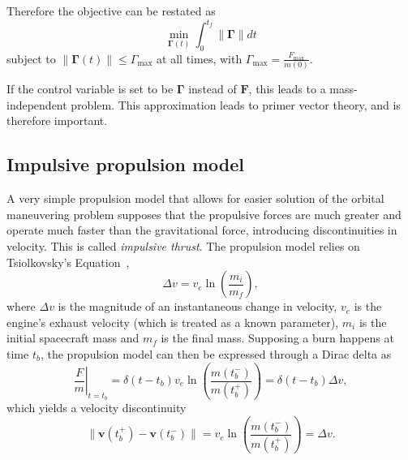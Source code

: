 Therefore the objective can be restated as
\begin{equation}\label{eq:obj_continuous_thrust}
    \min_{\mathbf{\Gamma}(t)} \int_0^{t_f} \lVert \mathbf{\Gamma} \rVert dt
\end{equation}
subject to \(\lVert \mathbf{\Gamma}(t) \rVert \leq \Gamma_{\max}\) at all times, with \(\Gamma_{\max} = \frac{F_{\max}}{m(0)}\).

If the control variable is set to be \(\mathbf{\Gamma}\) instead of \(\mathbf{F}\), this leads to a mass-independent problem. This approximation leads to primer vector theory, and is therefore important. 


\subsection{Impulsive propulsion model}


A very simple propulsion model that allows for easier solution of the orbital maneuvering problem supposes that the propulsive forces are much greater and operate much faster than the gravitational force, introducing discontinuities in velocity. This is called \textit{impulsive thrust}. The propulsion model relies on Tsiolkovsky's Equation~\cite{Conway_2010}, 
\begin{equation}
    \Delta v = v_e \ln{\left(\frac{m_i}{m_f}\right)},
\end{equation}
where \(\Delta v\) is the magnitude of an instantaneous change in velocity, \(v_e\) is the engine's exhaust velocity (which is treated as a known parameter), \(m_i\) is the initial spacecraft mass and \(m_f\) is the final mass. Supposing a burn happens at time \(t_b\), the propulsion model can then be expressed through a Dirac delta as
\begin{equation}
    \left.\frac{F}{m}\right\vert_{t = t_b} = \delta(t - t_b) v_e \ln{\left(\frac{m(t_b^-)}{m(t_b^+)} \right)} = \delta(t - t_b) \Delta v,
\end{equation}
which yields a velocity discontinuity
\begin{equation}
    \lVert \mathbf{v}(t_b^+) - \mathbf{v}(t_b^-) \rVert = v_e \ln{\left(\frac{m(t_b^-)}{m(t_b^+)}\right)} = \Delta v.
\end{equation}

